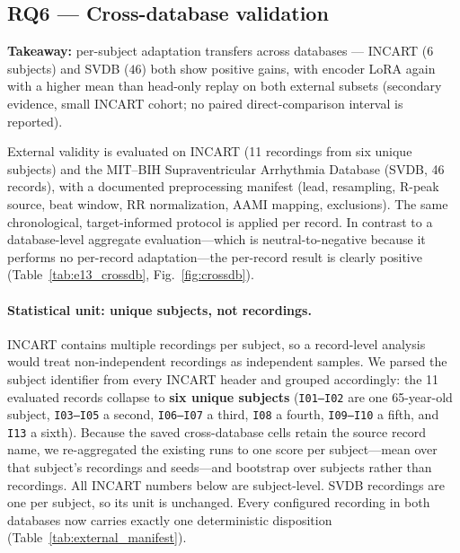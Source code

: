 \subsection{RQ6 --- Cross-database validation}
\label{sec:rq6}

\textbf{Takeaway:} per-subject adaptation transfers across databases --- INCART
($6$ subjects) and SVDB ($46$) both show positive gains, with encoder LoRA again
with a higher mean than head-only replay on both external subsets
(secondary evidence, small INCART cohort; no paired direct-comparison interval
is reported).

External validity is evaluated on INCART (11 recordings from six unique
subjects) and the MIT--BIH
Supraventricular Arrhythmia Database (SVDB, 46 records), with a documented
preprocessing manifest (lead, resampling, R-peak source, beat window, RR
normalization, AAMI mapping, exclusions). The same chronological,
target-informed protocol is applied per record. In contrast to a database-level
aggregate evaluation---which is neutral-to-negative because it performs no
per-record adaptation---the per-record result is clearly positive
(Table~\ref{tab:e13_crossdb}, Fig.~\ref{fig:crossdb}).

\paragraph{Statistical unit: unique subjects, not recordings.} INCART contains
multiple recordings per subject, so a record-level analysis would treat
non-independent recordings as independent samples. We parsed the subject
identifier from every INCART header and grouped accordingly: the 11 evaluated
records collapse to \textbf{six unique subjects} (\texttt{I01--I02} are one
65-year-old subject, \texttt{I03--I05} a second, \texttt{I06--I07} a third,
\texttt{I08} a fourth, \texttt{I09--I10} a fifth, and \texttt{I13} a sixth).
Because the saved cross-database cells retain the source record name, we
re-aggregated the existing runs to one score per subject---mean over that
subject's recordings and seeds---and bootstrap over subjects rather than
recordings. All INCART numbers below are subject-level. SVDB recordings are one
per subject, so its unit is unchanged. Every configured recording in both
databases now carries exactly one deterministic disposition
(Table~\ref{tab:external_manifest}).

